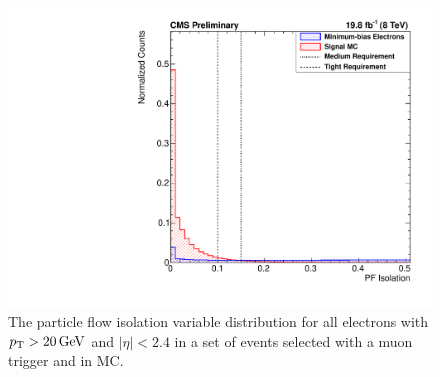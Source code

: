 \begin{figure}[!htbp]
    \centering
    \includegraphics[width=\StackedPlotWidth]{figures/e_reco_var_iso.pdf}
    \caption[
        Distributions of particle flow isolation variables in data and MC.
    ]{
        The particle flow isolation variable distribution for all electrons
        with $p_{\mathrm{T}} > 20 \,\text{Ge\hspace{-.08em}V}$ and $|\eta| < 2.4$ in a set of events selected
        with a muon trigger and in \MADGRAPH \Ztoee MC.
    }
    \label{fig:pf_iso}
\end{figure}

